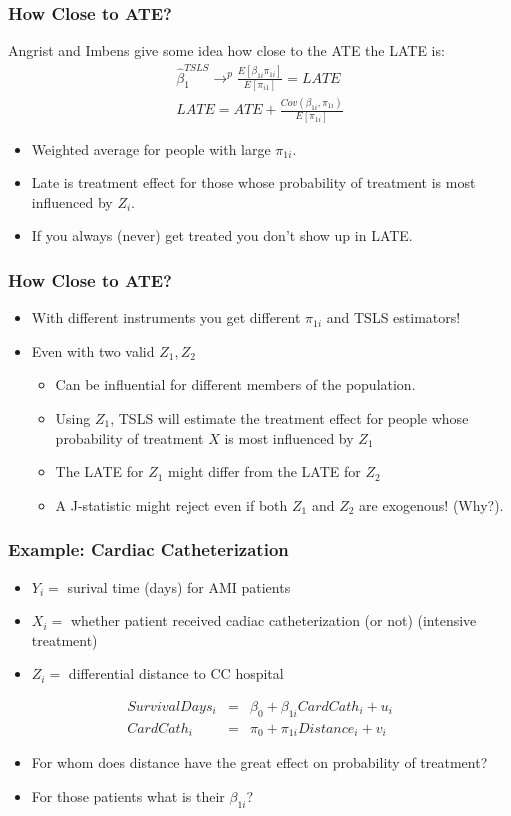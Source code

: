 \documentclass[xcolor=pdftex,dvipsnames,table,mathserif,aspectratio=169]{beamer}
\begin{document}
\begin{frame}
\frametitle{How Close to ATE?}
Angrist and Imbens give some idea how close to the ATE the LATE is:
\begin{eqnarray*}
\widehat{\beta}_1^{TSLS} \rightarrow^p \frac{E[\beta_{1i} \pi_{1i}]}{E[\pi_{i1}]} = LATE \\
LATE = ATE + \frac{Cov(\beta_{1i},\pi_{1i})}{E[\pi_{1i}]}
\end{eqnarray*}
\begin{itemize}
\item Weighted average for people with large $\pi_{1i}$.
\item Late is treatment effect for those whose probability of treatment is most influenced by $Z_i$.
\item If you always (never) get treated you don't show up in LATE.
\end{itemize}
\end{frame}

\begin{frame}
\frametitle{How Close to ATE?}
\begin{itemize}
\item With different instruments you get different $\pi_{1i}$ and TSLS estimators!
\item Even with two valid $Z_1, Z_2$
\begin{itemize}
\item Can be influential for different members of the population.
\item Using $Z_1$, TSLS will estimate the treatment effect for people whose probability of treatment $X$ is most influenced by $Z_1$
\item The LATE for $Z_1$ might differ from the LATE for $Z_2$
\item A J-statistic might reject even if both $Z_1$ and $Z_2$ are exogenous! (Why?).
\end{itemize}
\end{itemize}
\end{frame}


\begin{frame}
\frametitle{Example: Cardiac Catheterization}
\begin{itemize}
\item $Y_i=$ surival time (days) for AMI patients
\item $X_i=$ whether patient received cadiac catheterization (or not) (intensive treatment)
\item $Z_i=$ differential distance to CC hospital
\end{itemize}
\begin{eqnarray*}
SurvivalDays_i &=& \beta_0 + \beta_{1i} CardCath_i + u_i\\
CardCath_i &=& \pi_0 + \pi_{1i} Distance_i + v_i
\end{eqnarray*}
\begin{itemize}
\item For whom does distance have the great effect on probability of treatment?
\item For those patients what is their $\beta_{1i}$?
\end{itemize}
\end{frame}
\end{document}
